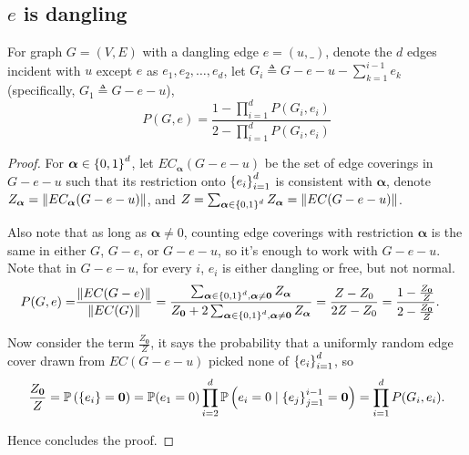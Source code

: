 \subsection{$e$ is dangling}
\begin{Lem}
For graph $G=(V,E)$ with a dangling edge $e=(u,\_)$, denote the $d$
edges incident with $u$ except $e$ as $e_1, e_2, \ldots, e_d$,
let $G_i \triangleq G - e - u - \sum_{k=1}^{i-1} e_k$ (specifically, $G_1 \triangleq G - e - u$),
	\begin{equation}
		P(G, e) = \frac{1-\prod_{i=1}^d P(G_i, e_i)}{2 - \prod_{i=1}^d P(G_i, e_i)} %
		\label{propp3rg}
	\end{equation}
\end{Lem}
\begin{proof}
	For $\boldsymbol\alpha \in \left\{0,1\right\}^d$, let $EC_{\boldsymbol\alpha}(G-e-u)$ be the set of edge coverings in $G-e-u$ such that its restriction onto $\left\{e_i\right\}_{i=1}^{d}$ is consistent with $\boldsymbol\alpha$, denote $Z_{\boldsymbol\alpha} = \left\Vert EC_{\boldsymbol\alpha}(G-e-u)\right\Vert$, and $Z = \sum_{\boldsymbol\alpha \in \left\{0,1\right\}^d} Z_{\boldsymbol\alpha} = \left\Vert EC(G-e-u)\right\Vert$. %

		Also note that as long as $\boldsymbol\alpha \neq 0$, counting edge coverings with restriction $\boldsymbol\alpha$ is the same in either $G$, $G-e$, or $G-e-u$, so it's enough to work with $G-e-u$. Note that in $G-e-u$, for every $i$, $e_i$ is either dangling or free, but not normal.
	\begin{align*}
		P(G,e) = & \frac{\left\Vert EC(G-e)\right\Vert}{\left\Vert EC(G)\right\Vert}
		= \frac{\sum_{\boldsymbol\alpha \in \left\{0,1\right\}^d, \boldsymbol\alpha \neq \mathbf{0}} Z_{\boldsymbol\alpha} }{ Z_{\mathbf{0}} + 2 \sum_{\boldsymbol\alpha \in \left\{0,1\right\}^d, \boldsymbol\alpha \neq \mathbf{0}} Z_{\boldsymbol\alpha}}
		=\frac{Z - Z_0}{2 Z - Z_0}
		= \frac{1 - \frac{Z_{\mathbf{0}}}{Z}}{ 2 - \frac{Z_{\mathbf{0}}}{Z}}.
	\end{align*}

	Now consider the term $\frac{Z_{\mathbf{0}}}{Z}$, it says the probability that a uniformly random edge cover drawn from $EC(G-e-u)$ picked none of $\left\{e_i\right\}_{i=1}^{d}$, so
	\begin{align*}
		\frac{Z_{\mathbf{0}}}{Z}=\mathbb{P} \left( \left\{e_i\right\} = \mathbf{0}\right) = \mathbb{P} (e_1 = 0) \prod_{i=2}^d \mathbb{P} \left(e_i = 0 \mid \left\{e_j\right\}_{j=1}^{i-1} = \mathbf{0}\right) = \prod_{i=1}^d P(G_i, e_i).
	\end{align*}

	Hence concludes the proof.
	
\end{proof}


